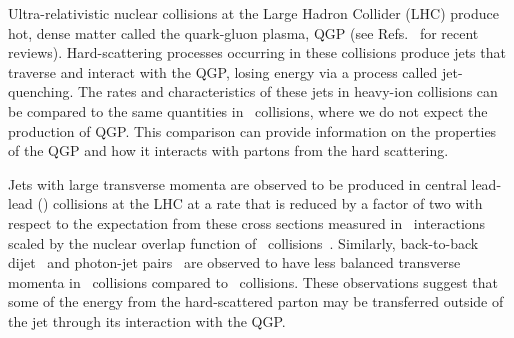
Ultra-relativistic nuclear collisions at the Large Hadron Collider (LHC) produce hot, dense matter
called the quark-gluon plasma, QGP (see Refs.~\cite{Roland:2014jsa,Busza:2018rrf} for recent reviews).
Hard-scattering processes occurring in these collisions produce jets that
traverse and interact with the QGP, losing energy via a process called jet-quenching. The rates and characteristics of these jets in heavy-ion collisions can be compared to the same quantities in \pp\ collisions, where we do not expect the production of QGP. This comparison can provide information on the properties of the QGP and how it interacts with partons from the hard scattering.

Jets with large transverse momenta are observed to be produced in central lead-lead (\pbpb) collisions at the LHC at a rate that is reduced by a factor of two with respect to the expectation from these cross sections measured in \pp\ interactions scaled by the nuclear overlap function of \pbpb\ collisions~\cite{Abelev:2013kqa,Aad:2014bxa,Adam:2015ewa,Khachatryan:2016jfl, 2019108}. 
Similarly, back-to-back dijet~\cite{Aad:2010bu,Chatrchyan:2011sx,Aaboud:2017eww} 
and photon-jet pairs~\cite{Chatrchyan:2012gt,Aaboud:2018anc} are observed to have
less balanced transverse momenta in \pbpb\ collisions compared to \pp\ collisions.
These observations suggest that some of the energy from the hard-scattered parton may be
transferred outside of the jet through its interaction with the QGP.  


